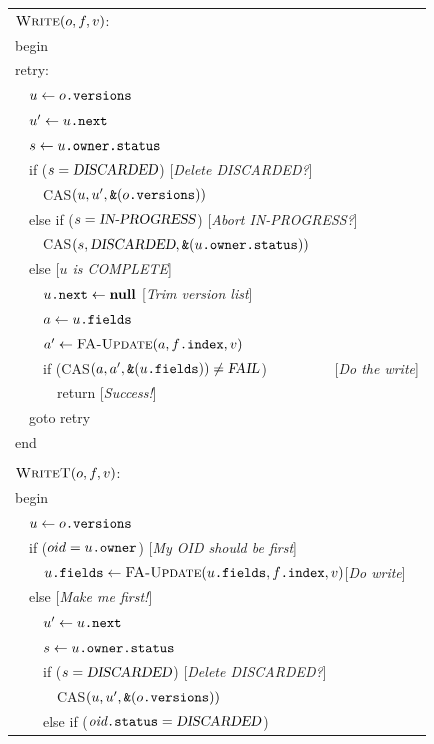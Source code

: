 \begin{figure}
\sis\small%
\renewcommand{\>}{~~}%
\newcommand{\com}[1]{\hfill [{\sl #1}]}%
\begin{tabular}{l}%
$\text{\sc Write}(o, f, v)$:\\
begin\\
retry:\\
\>$u  \gets o\text{\tt .versions}$\\
\>$u' \gets u\text{\tt .next}$\\
\>$s  \gets u\text{\tt .owner}\text{\tt .status}$\\
\>if ($s=\text{\sl DISCARDED}$) \com{Delete DISCARDED?}\\
\>\>CAS$(u, u', \text{\tt \&}(o\text{\tt .versions}))$\\
\>else if ($s=\text{\sl IN-PROGRESS}$) \com{Abort IN-PROGRESS?}\\
\>\>CAS$(s, \text{\sl DISCARDED}, \text{\tt \&}(u\text{\tt .owner}\text{\tt .status}))$\\
\>else \com{$u$ is COMPLETE}\\
\>\>$u\text{\tt .next} \gets \text{\bf null}$ \com{Trim version list}\\
\>\>$a \gets u\text{\tt .fields}$\\
\>\>$a' \gets \text{\sc FA-Update}(a, f\text{\tt .index}, v)$\\
\>\>if (CAS$(a, a', \text{\tt \&}(u\text{\tt .fields})) \neq \text{\sl FAIL}$)
~~~~~~~~~\com{Do the write}\\
\>\>\>return \com{Success!}\\
\>goto retry\\
end\\
\\
$\text{\sc WriteT}(o, f, v)$:\\
begin\\
\>$u  \gets o\text{\tt .versions}$\\
\>if ($oid = u\text{\tt .owner}$) \com{My OID should be first}\\
\>\>$u\text{\tt .fields} \gets \text{\sc FA-Update}(u\text{\tt .fields}, f\text{\tt .index}, v)$\com{Do write}\\
\>else \com{Make me first!}\\
\>\>$u' \gets u\text{\tt .next}$\\
\>\>$s  \gets u\text{\tt .owner}\text{\tt .status}$\\
\>\>if ($s=\text{\sl DISCARDED}$) \com{Delete DISCARDED?}\\
\>\>\>CAS$(u, u', \text{\tt \&}(o\text{\tt .versions}))$\\
\>\>else if ($\text{\it oid}\text{\tt .status}=\text{\sl DISCARDED}$)

\end{tabular}
\end{figure}
